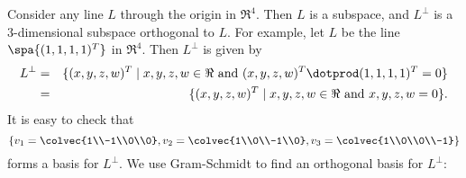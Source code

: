 
\begin{example}
Consider any line \(L\) through the origin in \(\Re^4\). Then \(L\) is a subspace, and \(L^\perp\) is a \(3\)-dimensional subspace orthogonal to \(L\). For example, let \(L\) be the line 
$\spa \{ (1,1,1,1)^T\}$ in \(\Re^4.\) Then \(L^\perp\) is given by
\begin{eqnarray*}
L^\perp&=&\{(x,y,z,w)^T \mid x,y,z,w \in \Re \text{ and } (x,y,z,w)^T \dotprod (1,1,1,1)^T=0\} \\
&=&\{(x,y,z,w)^T \mid x,y,z,w \in \Re \text{ and } x,y,z,w=0\}.
\end{eqnarray*}
It is easy to check that 
\[
\left\{
v_1=\colvec{1\\-1\\0\\0}, v_2=\colvec{1\\0\\-1\\0}, v_3=\colvec{1\\0\\0\\-1} \right \}
\] 
forms a basis for \(L^\perp\). We use Gram-Schmidt to find an orthogonal basis for \(L^\perp\):


\end{example}
